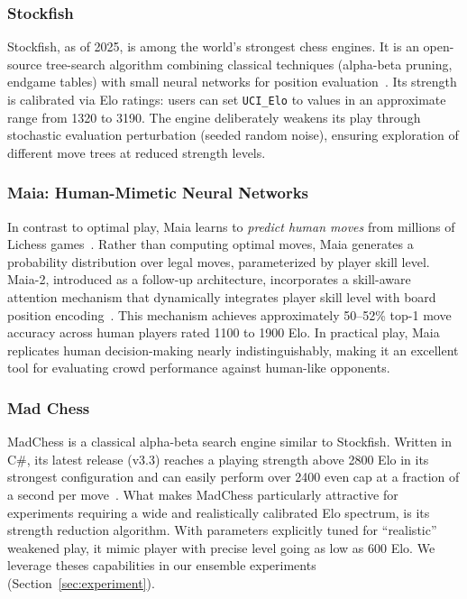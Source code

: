 \documentclass{article}
\begin{document}
\subsubsection{Stockfish}

Stockfish, as of 2025, is among the world's strongest chess engines.
It is an open-source tree-search algorithm combining classical techniques (alpha-beta pruning, endgame tables) with small neural networks for position evaluation~\cite{stockfish2024}.
Its strength is calibrated via Elo ratings: users can set \texttt{UCI\_Elo} to values in an approximate range from 1320 to 3190.
The engine deliberately weakens its play through stochastic evaluation perturbation (seeded random noise), ensuring exploration of different move trees at reduced strength levels.

\subsubsection{Maia: Human-Mimetic Neural Networks}

In contrast to optimal play, Maia learns to \emph{predict human moves} from millions of Lichess games~\cite{mcilroy-young2020}.
Rather than computing optimal moves, Maia generates a probability distribution over legal moves, parameterized by player skill level.
Maia-2, introduced as a follow-up architecture, incorporates a skill-aware attention mechanism that dynamically integrates player skill level with board position encoding~\cite{maia2024}.
This mechanism achieves approximately 50--52\% top-1 move accuracy across human players rated 1100 to 1900 Elo.
In practical play, Maia replicates human decision-making nearly indistinguishably, making it an excellent tool for evaluating crowd performance against human-like opponents.

\subsubsection{Mad Chess}

MadChess is a classical alpha-beta search engine similar to Stockfish.
Written in C\#, its latest release (v3.3) reaches a playing strength above 2800 Elo in its strongest configuration and can easily perform over 2400 even cap at a fraction of a second per move~\cite{madchess2025}.
What makes MadChess particularly attractive for experiments requiring a wide and realistically calibrated Elo spectrum, is its strength reduction algorithm.
With parameters explicitly tuned for “realistic” weakened play, it mimic player with precise level going as low as 600 Elo.
We leverage theses capabilities in our ensemble experiments (Section~\ref{sec:experiment}).
\end{document}
